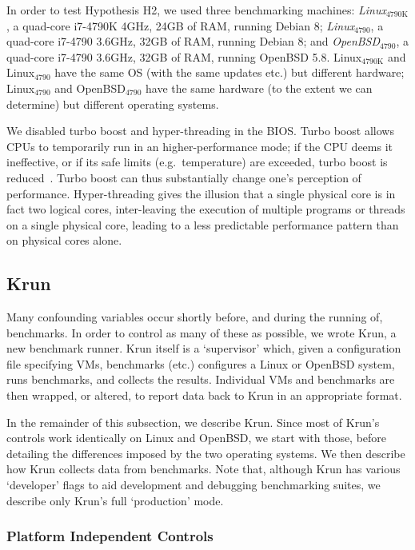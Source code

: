 \documentclass[preprint,numbers,10pt]{sigplanconf}
\newcommand{\krun}{Krun\xspace}
\newcommand{\bencherthree}{Linux$_\mathrm{4790K}$\xspace}
\newcommand{\bencherfive}{Linux$_\mathrm{4790}$\xspace}
\newcommand{\benchersix}{OpenBSD$_\mathrm{4790}$\xspace}
\begin{document}
In order to test Hypothesis H2, we used three benchmarking machines: \emph{\bencherthree}, a quad-core i7-4790K
4GHz, 24GB of RAM, running Debian 8; \emph{\bencherfive}, a quad-core i7-4790
3.6GHz, 32GB of RAM, running Debian 8; and \emph{\benchersix}, a quad-core i7-4790
3.6GHz, 32GB of RAM, running OpenBSD 5.8. \bencherthree and \bencherfive
have the same OS (with the same updates etc.) but different hardware; \bencherfive
and \benchersix have the same hardware (to the extent we can determine)
but different operating systems.

We disabled turbo boost and hyper-threading in the BIOS. Turbo boost
allows CPUs to temporarily run in an higher-performance
mode; if the CPU deems it ineffective, or if its safe limits (e.g.~temperature) are exceeded,
turbo boost is reduced~\cite{charles09turboboost}. Turbo boost
can thus substantially change one's
perception of performance. Hyper-threading gives the illusion that a single
physical core is in fact two logical cores, inter-leaving the
execution of multiple programs or threads on a single physical core,
leading to a less predictable performance pattern
than on physical cores alone.


\subsection{\krun}
\label{krun}

Many confounding variables occur shortly before, and during the running of,
benchmarks. In order to control as many of these as possible, we wrote
\krun, a new benchmark runner. \krun itself is a `supervisor'
which, given a configuration file specifying VMs, benchmarks (etc.) configures
a Linux or OpenBSD system, runs benchmarks, and collects the results. Individual VMs and benchmarks
are then wrapped, or altered, to report data back to \krun in an appropriate format.

In the remainder of this subsection, we describe \krun. Since most of \krun's
controls work identically on Linux and OpenBSD, we start with those,
before detailing the differences imposed by the two operating systems. We then
describe how \krun collects data from benchmarks.
Note that, although \krun has various `developer' flags to aid development
and debugging benchmarking suites, we describe only \krun's full `production' mode.


\subsubsection{Platform Independent Controls}
\end{document}

